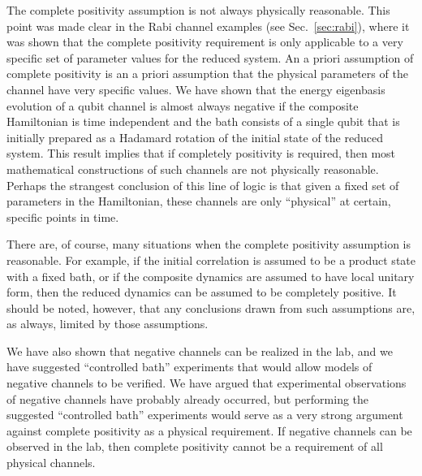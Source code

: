 The complete positivity assumption is not always physically reasonable.  This point was made clear in the Rabi channel examples (see Sec.\ \ref{sec:rabi}), where it was shown that the complete positivity requirement is only applicable to a very specific set of parameter values for the reduced system.  An a priori assumption of complete positivity is an a priori assumption that the physical parameters of the channel have very specific values.  We have shown that the energy eigenbasis evolution of a qubit channel is almost always negative if the composite Hamiltonian is time independent and the bath consists of a single qubit that is initially prepared as a Hadamard rotation of the initial state of the reduced system.  This result implies that if completely positivity is required, then most mathematical constructions of such channels are not physically reasonable.  Perhaps the strangest conclusion of this line of logic is that given a fixed set of parameters in the Hamiltonian, these channels are only ``physical'' at certain, specific points in time.

There are, of course, many situations when the complete positivity assumption is reasonable.  For example, if the initial correlation is assumed to be a product state with a fixed bath, or if the composite dynamics are assumed to have local unitary form, then the reduced dynamics can be assumed to be completely positive.  It should be noted, however, that any conclusions drawn from such assumptions are, as always, limited by those assumptions. 

We have also shown that negative channels can be realized in the lab, and we have suggested ``controlled bath'' experiments that would allow models of negative channels to be verified.  We have argued that experimental observations of negative channels have probably already occurred, but performing the suggested ``controlled bath'' experiments would serve as a very strong argument against complete positivity as a physical requirement.  If negative channels can be observed in the lab, then complete positivity cannot be a requirement of all physical channels.  

